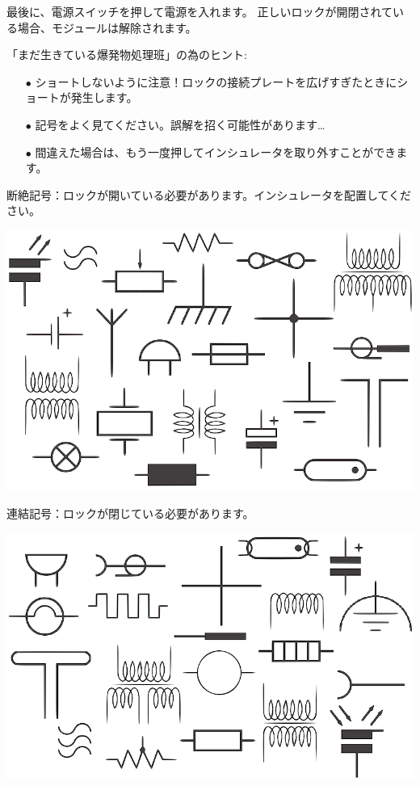 最後に{、}電源スイッチを押して電源を入れます。 正しいロックが開閉されている場合{、}モジュールは解除されます。

「まだ生きている爆発物処理班」の為のヒント:
\begin{itemize}
    \item[$\bullet$] ショートしないように注意！ロックの接続プレートを広げすぎたときにショートが発生します。
    \item[$\bullet$] 記号をよく見てください。誤解を招く可能性があります…
    \item[$\bullet$] 間違えた場合は{、}もう一度押してインシュレータを取り外すことができます。
\end{itemize}

\newpage

{\large 断絶記号：ロックが開いている必要があります。インシュレータを配置してください。}
\begin{center}
    \includegraphics[width=\textwidth]{images/14.png}
\end{center}

{\large 連結記号：ロックが閉じている必要があります。}
\begin{center}
    \includegraphics[width=\textwidth]{images/15.png}
\end{center}

